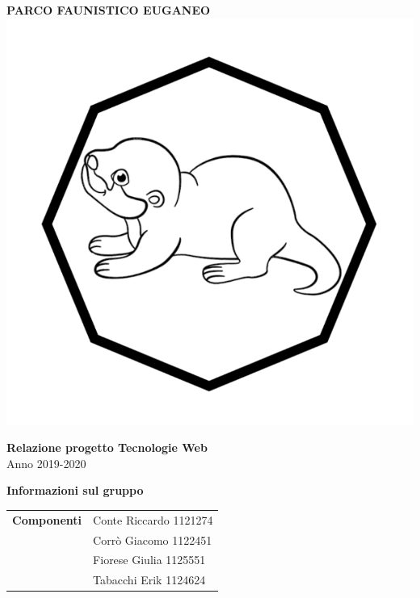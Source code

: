 \begin{center}
	\textbf{\Huge{PARCO FAUNISTICO EUGANEO}}\\
	\vspace{15pt}
	\includegraphics{./img/logo.png}
\end{center}

\vspace{1.5cm}

\begin{center}
	\textbf{\huge{Relazione progetto Tecnologie Web}}\\[0.2cm]
	\Large{Anno 2019-2020}
\end{center}

\vspace{5pt}

\begin{center}
	\textbf{\Large{Informazioni sul gruppo}}
\begin{table}[H]
	\hspace{3.5cm}
	\renewcommand{\arraystretch}{1.4}
	\begin{tabular}{l | l}
		\textbf{Componenti} & Conte Riccardo 1121274\\
		& Corrò Giacomo 1122451\\
		& Fiorese Giulia 1125551\\
		& Tabacchi Erik 1124624\\
	\end{tabular}
\end{table}
\end{center}

